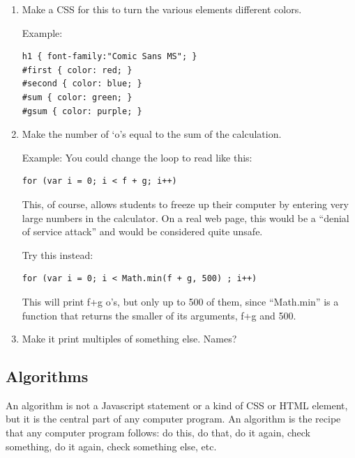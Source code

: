 \documentclass[11pt]{article}
\begin{document}
\begin{enumerate}

\item Make a CSS for this to turn the various elements different colors.

Example:

\begin{verbatim}
h1 { font-family:"Comic Sans MS"; }
#first { color: red; }
#second { color: blue; }
#sum { color: green; }
#gsum { color: purple; }
\end{verbatim}

\item Make the number of `o's equal to the sum of the calculation.

Example: You could change the loop to read like this:

\begin{verbatim}
for (var i = 0; i < f + g; i++)
\end{verbatim}

This, of course, allows students to freeze up their computer by
entering very large numbers in the calculator.  On a real web page, this
would be a ``denial of service attack'' and would be considered quite
unsafe.  


Try this instead:

\begin{verbatim}
for (var i = 0; i < Math.min(f + g, 500) ; i++)
\end{verbatim}

This will print f+g o's, but only up to 500 of them, since
``Math.min'' is a function that returns the smaller of its arguments,
f+g and 500. 

\item Make it print multiples of something else.  Names?

\end{enumerate}

\subsection{Algorithms}

An algorithm is not a Javascript statement or a kind of CSS or HTML
element, but it is the central part of any computer program.  An
algorithm is the recipe that any computer program follows: do this, do
that, do it again, check something, do it again, check something else,
etc.
\end{document}

